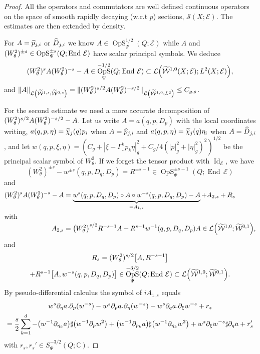\documentclass[AHL,Unicode,longabstracts]{cedram}
\newcommand{\C}{\mathbb{C}}
\newcommand{\clW}{\mathcal{W}}
\newcommand{\clE}{\mathcal{E}}
\newcommand{\clS}{\mathcal{S}}
\newcommand{\clL}{\mathcal{L}}
\DeclareMathOperator{\End}{End}
\DeclareMathOperator{\OpS}{OpS}
\DeclareMathOperator{\Idd}{Id}
\let\oldtilde\tilde
\renewcommand*{\tilde}[1]{\mathchoice{\widetilde{#1}}{\widetilde{#1}}{\oldtilde{#1}}{\oldtilde{#1}}}
\let\oldhat\hat
\renewcommand*{\hat}[1]{\mathchoice{\widehat{#1}}{\widehat{#1}}{\oldhat{#1}}{\oldhat{#1}}}
\let\originalleft\left
\let\originalright\right
\renewcommand{\left}{\mathopen{}\mathclose\bgroup\originalleft}
\renewcommand{\right}{\aftergroup\egroup\originalright}
\begin{document}
\begin{proof}
All the operators and commutators are well defined continuous operators on the space of smooth rapidly decaying (w.r.t $p$) sections, $\clS(X;\clE)$. The estimates are then extended by density.

For $A=\hat{p}_{j,i}$ or $\hat{D}_{j,i}$ we know $A\in \OpS^{1/2}_{\Psi}(Q;\clE)$ while $A$ and $(W^{2}_{\theta})^{\pm s}\in \OpS^{\pm s}_{\Psi}(Q;\linebreak\End\,\clE)$ have scalar principal symbols. We deduce
\[
(W^{2}_{\theta})^{s}A(W^{2}_{\theta})^{-s}-A\in \OpS^{-1/2}_{\Psi}(Q;\End\,\clE)\subset \clL\left(\tilde{\clW}^{1,0}(X;\clE);L^{2}(X;\clE)\right),
\]
and $\|A\|_{\clL\left(\widetilde{\clW}^{1,s};\widetilde{\clW}^{0,s}\right)}=\|(W^{2}_{\theta})^{s/2}A(W^{2}_{\theta})^{-s/2}\|_{\clL\left(\widetilde{\clW}^{1,0};L^{2}\right)}\leq C_{g,s}$.

For the second estimate we need a more accurate decomposition of $(W^{2}_{\theta})^{s/2}\linebreak A(W^{2}_{\theta})^{-s/2}-A$. Let us write $A=a(q,p,D_{p})$ with the local coordinates writing, $a(q,p,\eta)=\tilde{\chi}_{j}(q)p_{i}$ when $A=\hat{p}_{j,i}$ and $a(q,p,\eta)=\tilde{\chi}_{j}(q)\eta_{i}$ when $A=\hat{D}_{j,i}$, and let $w(q,p,\xi,\eta)=(C_{g}+|\xi-\Gamma_{..}^{k}p_{k}\eta|_{g}^{2}+C_{g}/4(|p|_{g}^{2}+|\eta|_{g}^{2})^{2})^{1/2}$ be the principal scalar symbol of $W^{2}_{\theta}$. If we forget the tensor product with $\Idd_{\clE}$, we have
\[
(W^{2}_{\theta})^{\pm s}-w^{\pm s}(q,p,D_{q},D_{p})=R^{\pm s-1}\in \OpS^{\pm s -1}_{\Psi}(Q;\End\,\clE)
\]
and
\begin{align*}
(W^{2}_{\theta})^{s}A(W^{2}_{\theta})^{-s}-A &=\underbrace{w^{s}(q,p,D_{q},D_{p})\circ A\circ w^{-s}(q,p,D_{q},D_{p})-A}_{=A_{1,s}}+ A_{2,s} +R_{s}
\\
\intertext{with}
A_{2,s}&= \left(W^{2}_{\theta}\right)^{s/2}R^{-s-1}A+R^{s-1}w^{-1}(q,p,D_{q},D_{p})A\in \clL\left(\tilde{\clW}^{1,0};\tilde{\clW}^{0,1}\right),\\
\end{align*}
and
\begin{multline*}
R_{s}=(W^{2}_{\theta})^{s/2}\left[A,R^{-s-1}\right]\\
+R^{s-1}\left[A,w^{-s}(q,p,D_{q},D_{p})\right]
\in
\OpS^{-3/2}_{\Psi}(Q;\End\,\clE)\subset \clL\left(\tilde{\clW}^{1,0};\tilde{\clW}^{0,1}\right).
\end{multline*}
By pseudo-differential calculus the symbol of $iA_{1,s}$ equals
\begin{multline*}
w^{s}\partial_{\eta}a.\partial_{p}(w^{-s})-w^{s}\partial_{p}a.\partial_{\eta}(w^{-s})-w^{s}\partial_{q}a.\partial_{\xi}w^{-s}+r_{s}\\
=\frac{s}{2}\sum_{k=1}^{d}-\left(w^{-1}\partial_{\eta_{k}}a\right)
\sharp \left(w^{-1}\partial_{p}w^{2}\right)+\left(w^{-1}\partial_{p_{k}}a\right)\sharp \left(w^{-1}\partial_{\eta_{k}}w^{2}\right)+ w^{s}\partial_{\xi}w^{-s}\sharp \partial_{q}a +r_{s}'
\end{multline*}
with $r_{s},r_{s}'\in S^{-3/2}_{\Psi}(Q;\C)$.


\end{proof}
\end{document}
